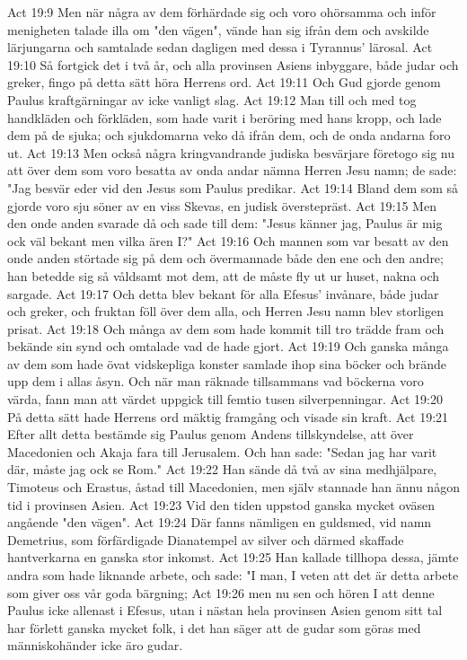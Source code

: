 Act 19:9  Men när några av dem förhärdade sig och voro ohörsamma och inför menigheten talade illa om "den vägen", vände han sig ifrån dem och avskilde lärjungarna och samtalade sedan dagligen med dessa i Tyrannus' lärosal.
Act 19:10  Så fortgick det i två år, och alla provinsen Asiens inbyggare, både judar och greker, fingo på detta sätt höra Herrens ord.
Act 19:11  Och Gud gjorde genom Paulus kraftgärningar av icke vanligt slag.
Act 19:12  Man till och med tog handkläden och förkläden, som hade varit i beröring med hans kropp, och lade dem på de sjuka; och sjukdomarna veko då ifrån dem, och de onda andarna foro ut.
Act 19:13  Men också några kringvandrande judiska besvärjare företogo sig nu att över dem som voro besatta av onda andar nämna Herren Jesu namn; de sade: "Jag besvär eder vid den Jesus som Paulus predikar.
Act 19:14  Bland dem som så gjorde voro sju söner av en viss Skevas, en judisk överstepräst.
Act 19:15  Men den onde anden svarade då och sade till dem: "Jesus känner jag, Paulus är mig ock väl bekant men vilka ären I?"
Act 19:16  Och mannen som var besatt av den onde anden störtade sig på dem och övermannade både den ene och den andre; han betedde sig så våldsamt mot dem, att de måste fly ut ur huset, nakna och sargade.
Act 19:17  Och detta blev bekant för alla Efesus' invånare, både judar och greker, och fruktan föll över dem alla, och Herren Jesu namn blev storligen prisat.
Act 19:18  Och många av dem som hade kommit till tro trädde fram och bekände sin synd och omtalade vad de hade gjort.
Act 19:19  Och ganska många av dem som hade övat vidskepliga konster samlade ihop sina böcker och brände upp dem i allas åsyn. Och när man räknade tillsammans vad böckerna voro värda, fann man att värdet uppgick till femtio tusen silverpenningar.
Act 19:20  På detta sätt hade Herrens ord mäktig framgång och visade sin kraft.
Act 19:21  Efter allt detta bestämde sig Paulus genom Andens tillskyndelse, att över Macedonien och Akaja fara till Jerusalem. Och han sade: "Sedan jag har varit där, måste jag ock se Rom."
Act 19:22  Han sände då två av sina medhjälpare, Timoteus och Erastus, åstad till Macedonien, men själv stannade han ännu någon tid i provinsen Asien.
Act 19:23  Vid den tiden uppstod ganska mycket oväsen angående "den vägen".
Act 19:24  Där fanns nämligen en guldsmed, vid namn Demetrius, som förfärdigade Dianatempel av silver och därmed skaffade hantverkarna en ganska stor inkomst.
Act 19:25  Han kallade tillhopa dessa, jämte andra som hade liknande arbete, och sade: "I man, I veten att det är detta arbete som giver oss vår goda bärgning;
Act 19:26  men nu sen och hören I att denne Paulus icke allenast i Efesus, utan i nästan hela provinsen Asien genom sitt tal har förlett ganska mycket folk, i det han säger att de gudar som göras med människohänder icke äro gudar.
